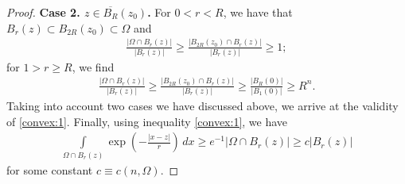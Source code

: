 \documentclass[10pt,a4paper]{amsart}
\newcommand{\I}{\int\limits}
\begin{document}
\begin{proof}
   \textbf{Case 2. $z\in \overline{B_{R}}(z_0)$. } For $0<r < R$, we have that $B_{r}(z)\subset B_{2R}(z_0)\subset \Omega$ and
 \begin{align*}
     \frac{|\Omega\cap B_{r}(z)|}{|B_{r}(z)|}
     \geqslant
     \frac{|B_{2R}(z_0)\cap B_{r}(z)|}{|B_{r}(z)|} \geqslant 1;
 \end{align*}
 for $1> r\geqslant R$, we find 
  \begin{align*}
     \frac{|\Omega\cap B_{r}(z)|}{|B_{r}(z)|}
     \geqslant
     \frac{|B_{2R}(z_0)\cap B_{r}(z)|}{|B_{r}(z)|} 
     \geqslant
     \frac{|B_{R}(0)|}{|B_{1}(0)|}
     \geqslant R^{n}.
 \end{align*}
Taking into account two cases we have discussed above, we arrive at the validity of \eqref{convex:1}. Finally, using inequality \eqref{convex:1}, we have 
\begin{align*}
    \I_{\Omega\cap B_{r}(z)} \exp\left(-\frac{|x-z|}{r}\right)\,dx
    \geqslant
    e^{-1}|\Omega\cap B_{r}(z)| \geqslant c |B_{r}(z)|
\end{align*}
for some constant $c\equiv c(n,\Omega)$. 
\end{proof}
\end{document}
